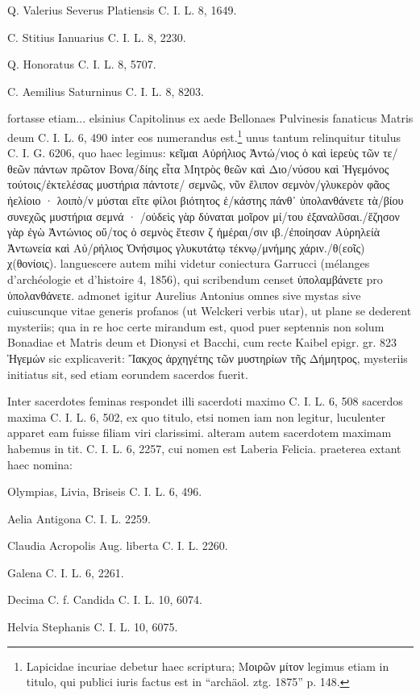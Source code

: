 \documentclass[a4paper, 11pt, oneside, polutonikogreek, german, twocolumn]{article}
\begin{document}
Q. Valerius Severus Platiensis C. I. L. 8, 1649.

C. Stitius Ianuarius C. I. L. 8, 2230.

Q. Honoratus C. I. L. 8, 5707.

C. Aemilius Saturninus C. I. L. 8, 8203.

fortasse etiam... elsinius Capitolinus ex aede Bellonaes Pulvinesis fanaticus Matris deum C. I. L. 6, 490 inter eos numerandus est.\footnote{Lapicidae incuriae debetur haec scriptura; Μοιρῶν μίτον legimus etiam in titulo, qui publici iuris factus est in "`archäol. ztg. 1875"' p. 148.} unus tantum relinquitur titulus C. I. G. 6206, quo haec legimus: κεῖμαι Αὐρήλιος Ἀντώ/νιος ὁ καὶ ἱερεὺς τῶν τε/θεῶν πάντων πρῶτον Βονα/δίης εἶτα Μητρὸς θεῶν καὶ Διο/νύσου καὶ Ἡγεμόνος τούτοις/ἐκτελέσας μυστήρια πάντοτε/ σεμνῶς, νῦν ἔλιπον σεμνὸν/γλυκερὸν φᾶος ἠελίοιο · λοιπὸ/ν μύσται εἴτε φίλοι βιότητος ἑ/κάστης πάνθ᾽ ὑπολανθάνετε τὰ/βίου συνεχῶς μυστήρια σεμνά · /οὐδεὶς γὰρ δύναται μοῖρον μί/του ἐξαναλῦσαι./ἕζησον γὰρ ἐγὼ Ἀντώνιος οὔ/τος ὁ σεμνὸς ἕτεσιν ζ ἡμέραι/σιν ιβ./ἐποίησαν Αὐρηλείὰ Ἀντωνεία καὶ Αὐ/ρήλιος Ὀνήσιμος γλυκυτάτῳ τέκνῳ/μνήμης χάριν./θ(εοῖς) χ(θονίοις). languescere autem mihi videtur coniectura Garrucci (mélanges d'archéologie et d'histoire 4, 1856), qui scribendum censet ὑπολαμβάνετε pro ὑπολανθάνετε. admonet igitur Aurelius Antonius omnes sive mystas sive cuiuscunque vitae generis profanos (ut Welckeri verbis utar), ut plane se dederent mysteriis; qua in re hoc certe mirandum est, quod puer septennis non solum Bonadiae et Matris deum et Dionysi et Bacchi, cum recte Kaibel epigr. gr. 823 Ἡγεμών sic explicaverit: Ἴακχος ἀρχηγέτης τῶν μυστηρίων τῆς Δήμητρος, mysteriis initiatus sit, sed etiam eorundem sacerdos fuerit.

Inter sacerdotes feminas respondet illi sacerdoti maximo C. I. L. 6, 508 sacerdos maxima C. I. L. 6, 502, ex quo titulo, etsi nomen iam non legitur, luculenter apparet eam fuisse filiam viri clarissimi. alteram autem sacerdotem maximam habemus in tit. C. I. L. 6, 2257, cui nomen est Laberia Felicia. praeterea extant haec nomina:

Olympias, Livia, Briseis C. I. L. 6, 496.

Aelia Antigona C. I. L. 2259.

Claudia Acropolis Aug. liberta C. I. L. 2260.

Galena C. I. L. 6, 2261.

Decima C. f. Candida C. I. L. 10, 6074.

Helvia Stephanis C. I. L. 10, 6075.
\end{document}

